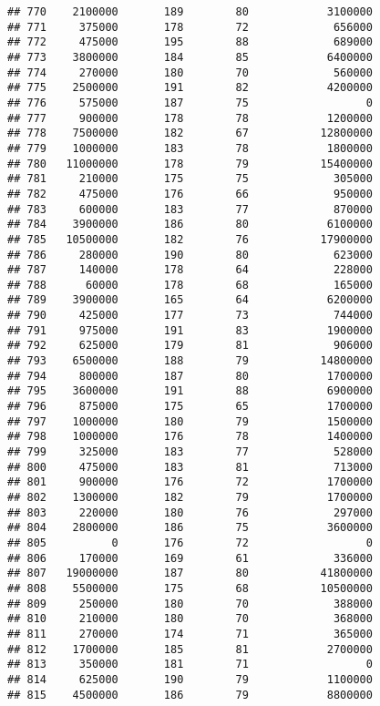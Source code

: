 \documentclass[
]{article}
\begin{document}
\begin{verbatim}
## 770    2100000       189        80            3100000
## 771     375000       178        72             656000
## 772     475000       195        88             689000
## 773    3800000       184        85            6400000
## 774     270000       180        70             560000
## 775    2500000       191        82            4200000
## 776     575000       187        75                  0
## 777     900000       178        78            1200000
## 778    7500000       182        67           12800000
## 779    1000000       183        78            1800000
## 780   11000000       178        79           15400000
## 781     210000       175        75             305000
## 782     475000       176        66             950000
## 783     600000       183        77             870000
## 784    3900000       186        80            6100000
## 785   10500000       182        76           17900000
## 786     280000       190        80             623000
## 787     140000       178        64             228000
## 788      60000       178        68             165000
## 789    3900000       165        64            6200000
## 790     425000       177        73             744000
## 791     975000       191        83            1900000
## 792     625000       179        81             906000
## 793    6500000       188        79           14800000
## 794     800000       187        80            1700000
## 795    3600000       191        88            6900000
## 796     875000       175        65            1700000
## 797    1000000       180        79            1500000
## 798    1000000       176        78            1400000
## 799     325000       183        77             528000
## 800     475000       183        81             713000
## 801     900000       176        72            1700000
## 802    1300000       182        79            1700000
## 803     220000       180        76             297000
## 804    2800000       186        75            3600000
## 805          0       176        72                  0
## 806     170000       169        61             336000
## 807   19000000       187        80           41800000
## 808    5500000       175        68           10500000
## 809     250000       180        70             388000
## 810     210000       180        70             368000
## 811     270000       174        71             365000
## 812    1700000       185        81            2700000
## 813     350000       181        71                  0
## 814     625000       190        79            1100000
## 815    4500000       186        79            8800000

\end{verbatim}
\end{document}
